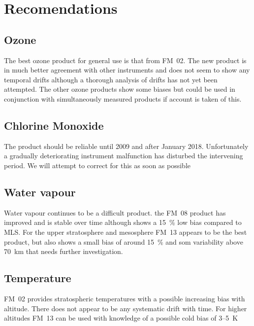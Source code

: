 \section{Recomendations}
\subsection{Ozone}
The best ozone product for general use is that from FM~02.  The new product is
in much better agreement with other instruments and does not seem to show any
temporal drifts although a thorough analysis of drifts has not yet been
attempted.  The other ozone products show some biases but could be used in
conjunction with simultaneously measured products if account is taken of this.

\subsection{Chlorine Monoxide}
The  product should be reliable until 2009 and after January 2018.
Unfortunately a gradually deteriorating instrument malfunction has disturbed
the intervening period.  We will attempt to correct for this as soon as
possible

\subsection{Water vapour}
Water vapour continues to be a difficult product. the FM~08 product has
improved and is stable over time although shows a 15~\% low bias compared to
MLS.  For the upper stratosphere and mesosphere FM~13 appears to be the best
product, but also shows a small bias of around 15~\% and som variability above
70~km that needs further investigation.

\subsection{Temperature}
FM~02 provides stratospheric temperatures with a possible increasing bias with
altitude. There does not appear to be any systematic drift with time. For
higher altitudes FM~13 can be used with knowledge of a possible cold bias of
3--5~K
